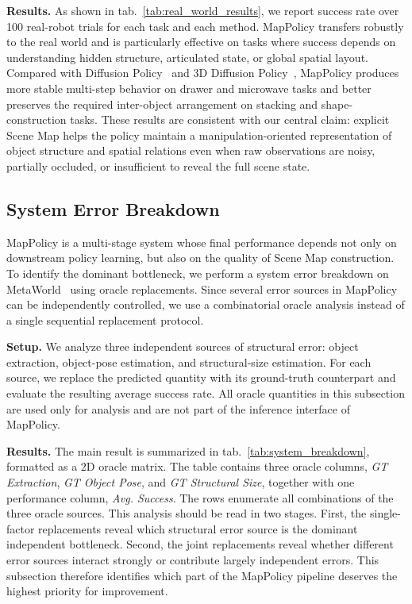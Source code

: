 \textbf{Results.}
As shown in tab.~\ref{tab:real_world_results}, we report success rate over 100 real-robot trials for each task and each method. MapPolicy transfers robustly to the real world and is particularly effective on tasks where success depends on understanding hidden structure, articulated state, or global spatial layout. Compared with Diffusion Policy~\cite{chi2024diffusionpolicy} and 3D Diffusion Policy~\cite{Ze2024DP3}, MapPolicy produces more stable multi-step behavior on drawer and microwave tasks and better preserves the required inter-object arrangement on stacking and shape-construction tasks. These results are consistent with our central claim: explicit Scene Map helps the policy maintain a manipulation-oriented representation of object structure and spatial relations even when raw observations are noisy, partially occluded, or insufficient to reveal the full scene state.

\subsection{System Error Breakdown}
\label{sec:system_breakdown}





MapPolicy is a multi-stage system whose final performance depends not only on downstream policy learning, but also on the quality of Scene Map construction. To identify the dominant bottleneck, we perform a system error breakdown on MetaWorld~\cite{Yu2020Meta,mclean2025metaworld} using oracle replacements. Since several error sources in MapPolicy can be independently controlled, we use a combinatorial oracle analysis instead of a single sequential replacement protocol.

\textbf{Setup.}
We analyze three independent sources of structural error: object extraction, object-pose estimation, and structural-size estimation. For each source, we replace the predicted quantity with its ground-truth counterpart and evaluate the resulting average success rate. All oracle quantities in this subsection are used only for analysis and are not part of the inference interface of MapPolicy.

\textbf{Results.}
The main result is summarized in tab.~\ref{tab:system_breakdown}, formatted as a 2D oracle matrix. The table contains three oracle columns, \textit{GT Extraction}, \textit{GT Object Pose}, and \textit{GT Structural Size}, together with one performance column, \textit{Avg. Success}. The rows enumerate all combinations of the three oracle sources.
This analysis should be read in two stages. First, the single-factor replacements reveal which structural error source is the dominant independent bottleneck. Second, the joint replacements reveal whether different error sources interact strongly or contribute largely independent errors. This subsection therefore identifies which part of the MapPolicy pipeline deserves the highest priority for improvement.


